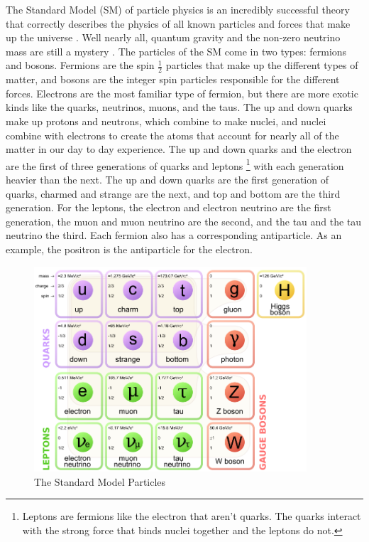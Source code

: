 \documentclass[12pt]{article}
\begin{document}
The Standard Model (SM) of particle physics is an incredibly successful theory that correctly describes the physics of all known particles and forces that make up the universe \cite{smconsistency}. Well nearly all, quantum gravity and the non-zero neutrino mass are still a mystery \cite{smconsistency,smnograv,zee}. The particles of the SM come in two types: fermions and bosons. Fermions are the spin $\frac{1}{2}$ particles that make up the different types of matter, and bosons are the integer spin particles responsible for the different forces. Electrons are the most familiar type of fermion, but there are more exotic kinds like the quarks, neutrinos, muons, and the taus. The up and down quarks make up protons and neutrons, which combine to make nuclei, and nuclei combine with electrons to create the atoms that account for nearly all of the matter in our day to day experience. The up and down quarks and the electron are the first of three generations of quarks and leptons \footnote{Leptons are fermions like the electron that aren't quarks. The quarks interact with the strong force that binds nuclei together and the leptons do not.} with each generation heavier than the next. The up and down quarks are the first generation of quarks, charmed and strange are the next, and top and bottom are the third generation. For the leptons, the electron and electron neutrino are the first generation, the muon and muon neutrino are the second, and the tau and the tau neutrino the third. Each fermion also has a corresponding antiparticle. As an example, the positron is the antiparticle for the electron. 

\begin{figure}[h!]
  \centering
  \includegraphics[width=4in]{images/Standard_Model_of_Elementary_Particles.png}
  \caption
   {The Standard Model Particles}
  \label{fig:smtable}
\end{figure}
\end{document}

